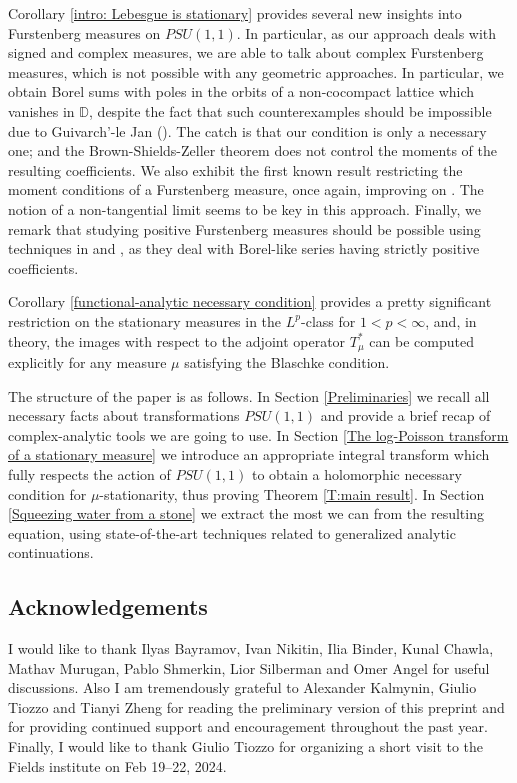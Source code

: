 \documentclass[11pt]{article}
\begin{document}
Corollary \ref{intro: Lebesgue is stationary} provides several new insights into Furstenberg measures on $PSU(1,1)$. In particular, as our approach deals with signed and complex measures, we are able to talk about complex Furstenberg measures, which is not possible with any geometric approaches. In particular, we obtain Borel sums with poles in the orbits of a non-cocompact lattice which vanishes in $\mathbb{D}$, despite the fact that such counterexamples should be impossible due to Guivarch'-le Jan (\cite{guivarch1990}). The catch is that our condition is only a necessary one; and the Brown-Shields-Zeller theorem does not control the moments of the resulting coefficients. We also exhibit the first known result restricting the moment conditions of a Furstenberg measure, once again, improving on \cite{Bourgain2012}. The notion of a non-tangential limit seems to be key in this approach. Finally, we remark that studying positive Furstenberg measures should be possible using techniques in \cite{bonsall1989vanishing} and \cite{hayman1990bases}, as they deal with Borel-like series having strictly positive coefficients.

Corollary \ref{functional-analytic necessary condition} provides a pretty significant restriction on the stationary measures in the $L^p$-class for $1 < p < \infty$, and, in theory, the images with respect to the adjoint operator $T_\mu^*$ can be computed explicitly for any measure $\mu$ satisfying the Blaschke condition.

The structure of the paper is as follows. In Section \ref{Preliminaries} we recall all necessary facts about transformations $PSU(1,1)$ and provide a brief recap of complex-analytic tools we are going to use. In Section \ref{The log-Poisson transform of a stationary measure} we introduce an appropriate integral transform which fully respects the action of $PSU(1,1)$ to obtain a holomorphic necessary condition for $\mu$-stationarity, thus proving Theorem \ref{T:main result}. In Section \ref{Squeezing water from a stone} we extract the most we can from the resulting equation, using state-of-the-art techniques related to generalized analytic continuations. 

\subsection{Acknowledgements}
I would like to thank Ilyas Bayramov, Ivan Nikitin, Ilia Binder, Kunal Chawla, Mathav Murugan, Pablo Shmerkin, Lior Silberman and Omer Angel for useful discussions. Also I am tremendously grateful to Alexander Kalmynin, Giulio Tiozzo and Tianyi Zheng for reading the preliminary version of this preprint and for providing continued support and encouragement throughout the past year. Finally, I would like to thank Giulio Tiozzo for organizing a short visit to the Fields institute on Feb 19--22, 2024. 
\end{document}
